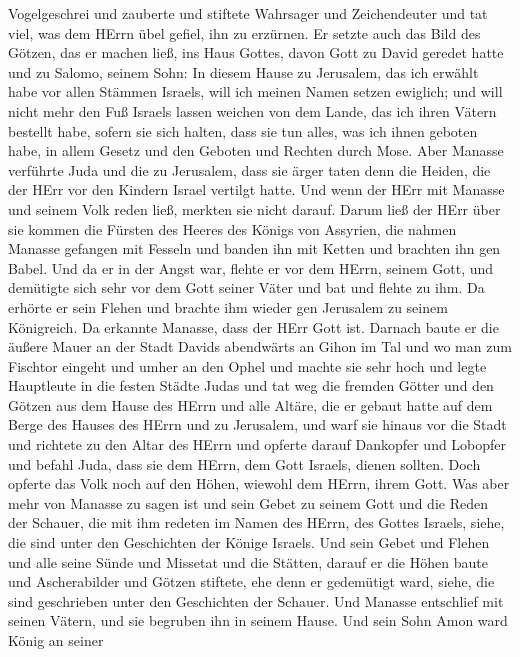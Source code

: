 Vogelgeschrei und zauberte und stiftete Wahrsager und Zeichendeuter und
tat viel, was dem HErrn übel gefiel, ihn zu erzürnen.  Er
setzte auch das Bild des Götzen, das er machen ließ, ins Haus Gottes,
davon Gott zu David geredet hatte und zu Salomo, seinem Sohn: In diesem
Hause zu Jerusalem, das ich erwählt habe vor allen Stämmen Israels, will
ich meinen Namen setzen ewiglich;  und will nicht mehr den
Fuß Israels lassen weichen von dem Lande, das ich ihren Vätern bestellt
habe, sofern sie sich halten, dass sie tun alles, was ich ihnen geboten
habe, in allem Gesetz und den Geboten und Rechten durch Mose.
 Aber Manasse verführte Juda und die zu Jerusalem, dass sie
ärger taten denn die Heiden, die der HErr vor den Kindern Israel
vertilgt hatte.  Und wenn der HErr mit Manasse und seinem
Volk reden ließ, merkten sie nicht darauf.  Darum ließ der
HErr über sie kommen die Fürsten des Heeres des Königs von Assyrien, die
nahmen Manasse gefangen mit Fesseln und banden ihn mit Ketten und
brachten ihn gen Babel.  Und da er in der Angst war, flehte
er vor dem HErrn, seinem Gott, und demütigte sich sehr vor dem Gott
seiner Väter  und bat und flehte zu ihm. Da erhörte er sein
Flehen und brachte ihm wieder gen Jerusalem zu seinem Königreich. Da
erkannte Manasse, dass der HErr Gott ist.  Darnach baute er
die äußere Mauer an der Stadt Davids abendwärts an Gihon im Tal und wo
man zum Fischtor eingeht und umher an den Ophel und machte sie sehr hoch
und legte Hauptleute in die festen Städte Judas  und tat
weg die fremden Götter und den Götzen aus dem Hause des HErrn und alle
Altäre, die er gebaut hatte auf dem Berge des Hauses des HErrn und zu
Jerusalem, und warf sie hinaus vor die Stadt  und richtete
zu den Altar des HErrn und opferte darauf Dankopfer und Lobopfer und
befahl Juda, dass sie dem HErrn, dem Gott Israels, dienen sollten.
 Doch opferte das Volk noch auf den Höhen, wiewohl dem
HErrn, ihrem Gott.  Was aber mehr von Manasse zu sagen ist
und sein Gebet zu seinem Gott und die Reden der Schauer, die mit ihm
redeten im Namen des HErrn, des Gottes Israels, siehe, die sind unter
den Geschichten der Könige Israels.  Und sein Gebet und
Flehen und alle seine Sünde und Missetat und die Stätten, darauf er die
Höhen baute und Ascherabilder und Götzen stiftete, ehe denn er
gedemütigt ward, siehe, die sind geschrieben unter den Geschichten der
Schauer.  Und Manasse entschlief mit seinen Vätern, und sie
begruben ihn in seinem Hause. Und sein Sohn Amon ward König an seiner
